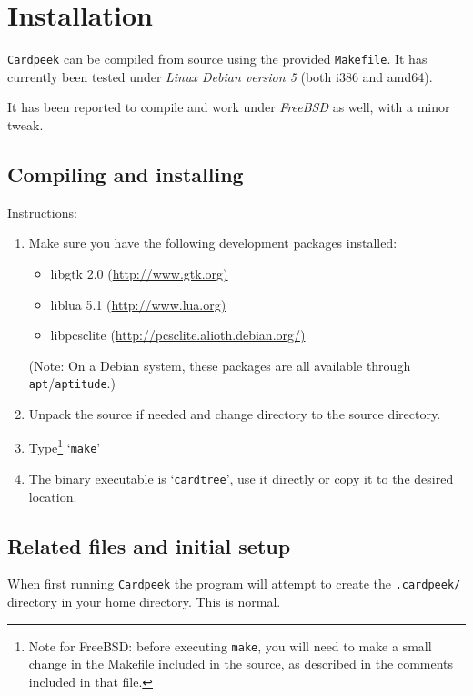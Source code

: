 \documentclass[11pt]{report}
\begin{document}
\tableofcontents

\chapter{Installation}

\texttt{Cardpeek} can be compiled from source using the provided \texttt{Makefile}.
It has currently been tested under \emph{Linux Debian version 5} (both i386 and amd64).

It has been reported to compile and work under \emph{FreeBSD} as well, with a minor tweak.

\section{Compiling and installing}

Instructions:
\begin{enumerate}

\item{Make sure you have the following development packages installed:
  \begin{itemize}
  \item{libgtk 2.0 (\url{http://www.gtk.org)}}
  \item{liblua 5.1 (\url{http://www.lua.org)}}
  \item{libpcsclite (\url{http://pcsclite.alioth.debian.org/)}}
  \end{itemize}
(Note: On a Debian system, these packages are all available through \texttt{apt}/\texttt{aptitude}.)
}

\item{Unpack the source if needed and change directory to the source directory.}

\item{Type\footnote{Note for FreeBSD: before executing \texttt{make}, 
you will need to make a small change in the Makefile included in the source, 
as described in the comments included in that file.} `\texttt{make}'}

\item{The binary executable is `\texttt{cardtree}', use it directly or copy it to the desired location.}

\end{enumerate}


\section{Related files and initial setup}
When first running \texttt{Cardpeek} the program will attempt to create the
\texttt{.cardpeek/} directory in your home directory. This is normal.
\end{document}
